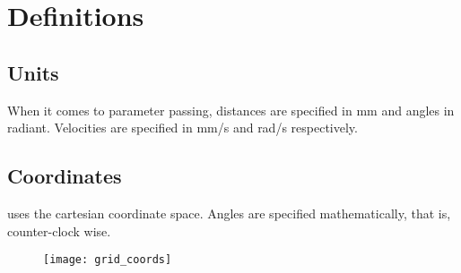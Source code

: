 \chapter{Definitions}


\section{Units}

When it comes to parameter passing, distances are specified in mm and
angles in radiant. Velocities are specified in mm/s and rad/s
respectively. 

\section{Coordinates}

\miro uses the cartesian coordinate space. Angles are specified
mathematically, that is, counter-clock wise.



\begin{figure}[!ht]
  \begin{center}
    \texttt{[image: grid\_coords]}
  \end{center}
\end{figure}


